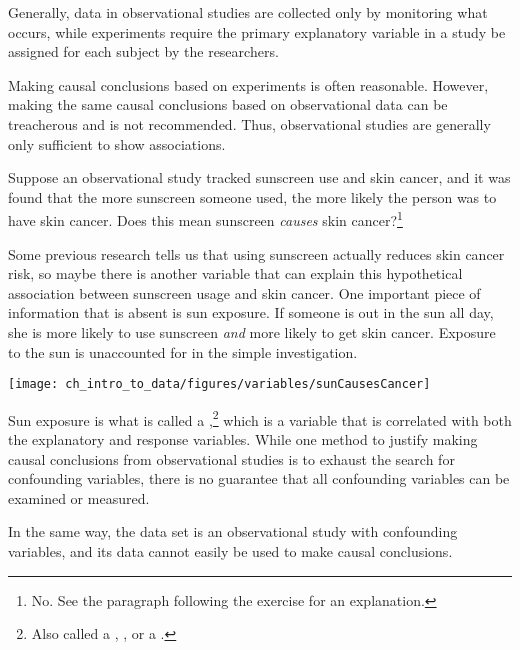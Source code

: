 Generally, data in observational studies are collected only by monitoring what occurs, while experiments require the primary explanatory variable in a study be assigned for each subject by the researchers.

Making causal conclusions based on experiments is often reasonable. However, making the same causal conclusions based on observational data can be treacherous and is not recommended. Thus, observational studies are generally only sufficient to show associations.

\begin{exercise} \label{sunscreenLurkingExample}
Suppose an observational study tracked sunscreen use and skin cancer, and it was found that the more sunscreen someone used, the more likely the person was to have skin cancer. Does this mean sunscreen \emph{causes} skin cancer?\footnote{No. See the paragraph following the exercise for an explanation.}
\end{exercise}

Some previous research tells us that using sunscreen actually reduces skin cancer risk, so maybe there is another variable that can explain this hypothetical association between sunscreen usage and skin cancer. One important piece of information that is absent is sun exposure. If someone is out in the sun all day, she is more likely to use sunscreen \emph{and} more likely to get skin cancer. Exposure to the sun is unaccounted for in the simple investigation.
\begin{center}
\texttt{[image: ch\_intro\_to\_data/figures/variables/sunCausesCancer]}
\end{center}

Sun exposure is what is called a ,\footnote{Also called a , , or a .} which is a variable that is correlated with both the explanatory and response variables. While one method to justify making causal conclusions from observational studies is to exhaust the search for confounding variables, there is no guarantee that all confounding variables can be examined or measured.

In the same way, the  data set is an observational study with confounding variables, and its data cannot easily be used to make causal conclusions.

